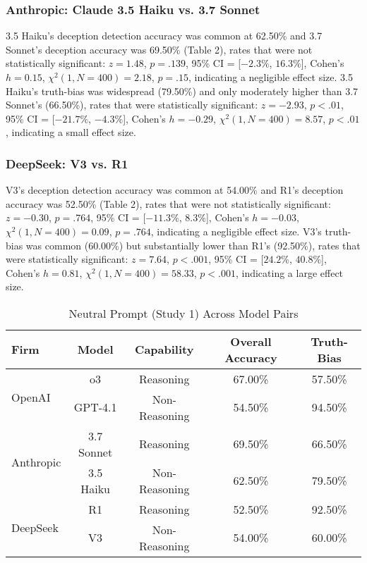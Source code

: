 \documentclass{article}
\begin{document}
\subsubsection{Anthropic: Claude 3.5 Haiku vs. 3.7 Sonnet}

3.5 Haiku's deception detection accuracy was common at 62.50\% and 3.7 Sonnet's deception accuracy was 69.50\% (Table 2), rates that were not statistically significant:  $z = 1.48$, $p = .139$, 95\% CI = [$-2.3\%$, $16.3\%$], Cohen’s $h =0.15$, $\chi^2(1, N = 400) = 2.18$, $p = .15$, indicating a negligible effect size. 3.5 Haiku's truth-bias was widespread (79.50\%) and only moderately higher than 3.7 Sonnet's (66.50\%), rates that were statistically significant: $z = -2.93$, $p < .01$, 95\% CI = [$-21.7\%$, $-4.3\%$], Cohen’s $h = -0.29$, $\chi^2(1, N = 400) = 8.57$, $p < .01$, indicating a small effect size.

\subsubsection{DeepSeek: V3 vs. R1}

V3's deception detection accuracy was common at 54.00\% and R1's deception accuracy was 52.50\% (Table 2), rates that were not statistically significant:  $z = -0.30$, $p = .764$, 95\% CI = [$-11.3\%$, $8.3\%$], Cohen’s $h =-0.03$, $\chi^2(1, N = 400) = 0.09$, $p = .764$, indicating a negligible effect size. V3's truth-bias was common (60.00\%) but substantially lower than R1's (92.50\%), rates that were statistically significant: $z = 7.64$, $p < .001$, 95\% CI = [$24.2\%$, $40.8\%$], Cohen’s $h = 0.81$, $\chi^2(1, N = 400) = 58.33$, $p < .001$, indicating a large effect size.

\begin{table}[ht]
\centering
\caption{Neutral Prompt (Study 1) Across Model Pairs}
\begin{tabular}{lcccc}
\toprule
\textbf{Firm} & \textbf{Model} & \textbf{Capability} & \textbf{Overall Accuracy} & \textbf{Truth-Bias} \\
\midrule
\multirow{2}{*}{OpenAI} & o3 & Reasoning & 67.00\% & 57.50\%  \\
& GPT-4.1 & Non-Reasoning & 54.50\% & 94.50\% \\
\midrule
\multirow{2}{*}{Anthropic} & 3.7 Sonnet & Reasoning & 69.50\% & 66.50\% \\
& 3.5 Haiku & Non-Reasoning & 62.50\% & 79.50\% \\
\midrule
\multirow{2}{*}{DeepSeek} & R1 & Reasoning & 52.50\% & 92.50\% \\
& V3 & Non-Reasoning & 54.00\% & 60.00\% \\
\bottomrule
\end{tabular}
\label{tab:study1_model_comparison}
\end{table}
\end{document}
